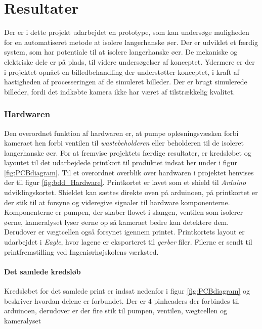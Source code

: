 \chapter{Resultater}

Der er i dette projekt udarbejdet en prototype, som kan undersøge muligheden for en automatiseret metode at isolere langerhanske øer. Der er udviklet et færdig system, som har potentiale til at isolere langerhanske øer. De mekaniske og elektriske dele er på plads, til videre undersøgelser af konceptet. Ydermere er der i projektet opnået en billedbehandling der understøtter konceptet, i kraft af hastigheden af processeringen af de simuleret billeder. Der er brugt simulerede billeder, fordi det indkøbte kamera ikke har været af tilstrækkelig kvalitet.



\subsection{Hardwaren}

Den overordnet funktion af hardwaren er, at pumpe opløsningsvæsken forbi kameraet hen forbi ventilen til \textit{wastebeholderen} eller beholderen til de isoleret langerhanske øer. For at fremvise projektets færdige resultater, er kredsløbet og layoutet til det udarbejdede printkort til produktet indsat her under i figur \ref{fig:PCBdiagram}. Til et overordnet overblik over hardwaren i projektet henvises der til figur \ref{fig:bdd_Hardware}. Printkortet er lavet som et shield til \textit{Arduino} udviklingskortet. Shieldet kan sættes direkte oven på arduinoen, på printkortet er der stik til at forsyne og videregive signaler til hardware komponenterne. Komponenterne er pumpen, der skaber flowet i slangen, ventilen som isolerer øerne, kameralyset lyser øerne op så kameraet bedre kan detektere dem. Derudover er vægtcellen også forsynet igennem printet. Printkortets layout er udarbejdet i \textit{Eagle}, hvor lagene er eksporteret til \textit{gerber} filer. Filerne er sendt til printfremstilling ved Ingeniørhøjskolens værksted.

\newpage
\subsubsection{Det samlede kredsløb}

Kredsløbet for det samlede print er indsat nedenfor i figur \ref{fig:PCBdiagram} og beskriver hvordan delene er forbundet. Der er 4 pinheaders der forbindes til arduinoen, derudover er der fire stik til pumpen, ventilen, vægtcellen og kameralyset 

